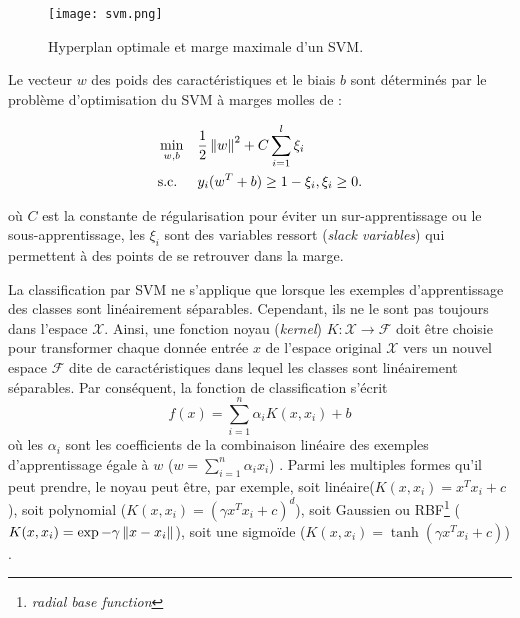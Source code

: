 \begin{figure}[!htb]
	\centering
	\texttt{[image: svm.png]}
	\caption{Hyperplan optimale et marge maximale d'un SVM.}\label{fig:sensresultat:svm}
\end{figure}

 Le vecteur  $w$ des  poids des caractéristiques et le biais $b$ sont déterminés par le problème d'optimisation du \og SVM à marges molles \fg{} de \citet{Cortes1995svm} :
 

\begin{equation*}
\begin{aligned}
& \mathop{\mathrm{min}}\limits\limits_{w,b}
& &\frac{1}{2}\left\lVert w\right\rVert^2 + C \sum\limits^l_{i=1} \xi_i \\
& \text{s.c.}
& & y_i(w^T+b)\geq 1-\xi_i, \xi_i \geq 0.
\end{aligned}
\end{equation*}

où $C$ est la constante de régularisation pour éviter un sur-apprentissage ou le sous-apprentissage, les $\xi_i$ sont des variables ressort (\textit{slack variables}) qui permettent à des points de se retrouver dans la marge. 


La classification par SVM ne s'applique que lorsque les exemples d'apprentissage des classes sont linéairement séparables. Cependant, ils ne le sont pas toujours dans l'espace  $\mathcal{X}$. Ainsi, une fonction \og noyau \fg{} (\textit{kernel}) $K: \mathcal{X} \longrightarrow \mathcal{F}$ doit être choisie pour transformer chaque donnée entrée $x$ de l'espace original  $\mathcal{X}$ vers un nouvel espace  $\mathcal{F}$ dite de caractéristiques dans lequel les classes sont linéairement séparables. Par conséquent, la fonction de classification s'écrit \[f(x) = \sum\limits_{i=1}^n \alpha_i K(x,x_i) + b\] où les $\alpha_i$ sont les coefficients de la combinaison linéaire des exemples d'apprentissage égale à $w$ ($w = \sum\limits_{i=1}^n\alpha_i x_i$) \citep{Ben-Hur2010svm}. Parmi les multiples formes qu'il peut prendre, le noyau peut être, par exemple, soit linéaire($K(x,x_i) = x^Tx_i + c$), soit polynomial ($K(x,x_i) = (\gamma x^Tx_i + c)^d$), soit Gaussien ou RBF\footnote{\textit{radial base function}} ($K(x,x_i) = \exp{-\gamma \left\lVert x-x_i\right\rVert}$), soit une sigmoïde ($K(x,x_i) = \tanh(\gamma x^Tx_i + c)$) \citep{Amami2015PracticalModelSelectionSVM}.

